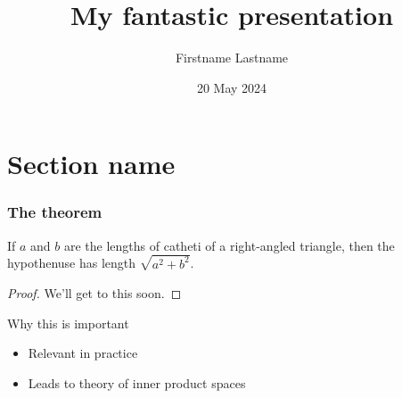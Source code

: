 \documentclass{beamer}
\title{My fantastic presentation}
\author[F.~Lastname]{Firstname Lastname}
\institute[U.~Puuhamaa]{University of Puuhamaa}
\date{20 May 2024}
\begin{document}
\maketitle

\section{Section name}

\begin{frame}[label=contents]
\frametitle{The theorem}

\begin{theorem}
If $a$ and $b$ are the lengths of catheti of a right-angled triangle,
then the hypothenuse has length $\sqrt{a^2 + b^2}$.
\end{theorem}
\begin{proof}
We'll get to this soon.
\end{proof}

\begin{block}{Why this is important}
\begin{itemize}
\item Relevant in practice
\item Leads to theory of inner product spaces
\end{itemize}
\end{block}

\end{frame}







\end{document}
